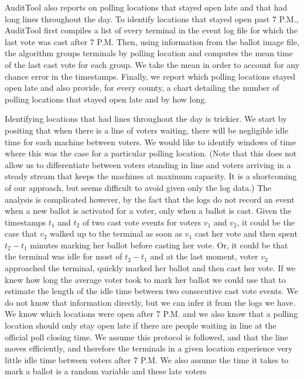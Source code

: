 \documentclass[letterpaper,twocolumn,10pt]{article}
\begin{document}
AuditTool also reports on polling locations that stayed open late and that had
long lines throughout the day. To identify locations that stayed open past 7
P.M., AuditTool first compiles a list of every terminal in the event log file
for which the last vote was cast after 7 P.M. Then, using information from the
ballot image file, the algorithm groups terminals by polling location and
computes the mean time of the last cast vote for each group. We take the mean in
order to account for any chance error in the timestamps. Finally, we report which
polling locations stayed open late and also provide, for every county, a chart
detailing the number of polling locations that stayed open late and by how
long. 
	 		
Identifying locations that had lines throughout the day is trickier. We start by
positing that when there is a line of voters waiting, there will be negligible
idle time for each machine between voters. We would like to identify windows of
time where this was the case for a particular polling location. (Note that this
does not allow us to differentiate between voters standing in line and voters
arriving in a steady stream that keeps the machines at maximum capacity. It is a
shortcoming of our approach, but seems difficult to avoid given only the log
data.) The analysis is complicated however, by the fact that the logs do not
record an event when a new ballot is activated for a voter, only when a ballot
is cast. Given the timestamps $t_1$ and $t_2$ of two cast vote events for voters
$v_1$ and $v_2$, it could be the case that $v_2$ walked up to the terminal
as soon as $v_1$ cast her vote and then spent $t_2-t_1$ minutes marking her
ballot before casting her vote. Or, it could be that the terminal was idle for
most of $t_2-t_1$ and at the last moment, voter $v_2$ approached the terminal,
quickly marked her ballot and then cast her vote. If we knew how long the
average voter took to mark her ballot we could use that to estimate the length
of the idle time between two consecutive cast vote events. We do not know that
information directly, but we can infer it from the logs we have. We know which
locations were open after 7 P.M. and we also know that a polling location should
only stay open late if there are people waiting in line at the official poll
closing time. We assume this protocol is followed, and that
the line moves efficiently, and therefore the terminals in a given location
experience very little idle time between voters after 7 P.M. We also assume
the time it takes to mark a ballot is a random variable and these late voters
\end{document}
